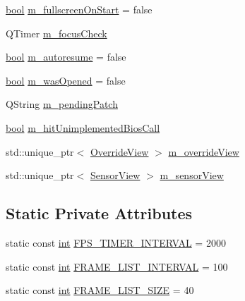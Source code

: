 \begin{DoxyCompactItemize}
\item 
\mbox{\hyperlink{libretro_8h_a4a26dcae73fb7e1528214a068aca317e}{bool}} \mbox{\hyperlink{class_q_g_b_a_1_1_window_ae96899be0952b7f0329ccf2142bc7400}{m\+\_\+fullscreen\+On\+Start}} = false
\item 
Q\+Timer \mbox{\hyperlink{class_q_g_b_a_1_1_window_af5c6c03bb6868222517bbc5c5bc8a091}{m\+\_\+focus\+Check}}
\item 
\mbox{\hyperlink{libretro_8h_a4a26dcae73fb7e1528214a068aca317e}{bool}} \mbox{\hyperlink{class_q_g_b_a_1_1_window_af5d25084346b2cb25387d0d351d9f79c}{m\+\_\+autoresume}} = false
\item 
\mbox{\hyperlink{libretro_8h_a4a26dcae73fb7e1528214a068aca317e}{bool}} \mbox{\hyperlink{class_q_g_b_a_1_1_window_a23c19613ffd9ef874abf68a83417004d}{m\+\_\+was\+Opened}} = false
\item 
Q\+String \mbox{\hyperlink{class_q_g_b_a_1_1_window_a9eab696d83d55f3636732fd1f72116fa}{m\+\_\+pending\+Patch}}
\item 
\mbox{\hyperlink{libretro_8h_a4a26dcae73fb7e1528214a068aca317e}{bool}} \mbox{\hyperlink{class_q_g_b_a_1_1_window_a30063666e74e9c2de810e80a2fdb87dc}{m\+\_\+hit\+Unimplemented\+Bios\+Call}}
\item 
std\+::unique\+\_\+ptr$<$ \mbox{\hyperlink{class_q_g_b_a_1_1_override_view}{Override\+View}} $>$ \mbox{\hyperlink{class_q_g_b_a_1_1_window_a3b058447bfa53782c268fdcc1b035184}{m\+\_\+override\+View}}
\item 
std\+::unique\+\_\+ptr$<$ \mbox{\hyperlink{class_q_g_b_a_1_1_sensor_view}{Sensor\+View}} $>$ \mbox{\hyperlink{class_q_g_b_a_1_1_window_ae3cb43b35d0a827094e2491ee09f2056}{m\+\_\+sensor\+View}}
\end{DoxyCompactItemize}
\subsection*{Static Private Attributes}
\begin{DoxyCompactItemize}
\item 
static const \mbox{\hyperlink{ioapi_8h_a787fa3cf048117ba7123753c1e74fcd6}{int}} \mbox{\hyperlink{class_q_g_b_a_1_1_window_a3429e7b95854ae5e646481d4a933ca04}{F\+P\+S\+\_\+\+T\+I\+M\+E\+R\+\_\+\+I\+N\+T\+E\+R\+V\+AL}} = 2000
\item 
static const \mbox{\hyperlink{ioapi_8h_a787fa3cf048117ba7123753c1e74fcd6}{int}} \mbox{\hyperlink{class_q_g_b_a_1_1_window_a66d2864437fc3737056e41e24fd659d7}{F\+R\+A\+M\+E\+\_\+\+L\+I\+S\+T\+\_\+\+I\+N\+T\+E\+R\+V\+AL}} = 100
\item 
static const \mbox{\hyperlink{ioapi_8h_a787fa3cf048117ba7123753c1e74fcd6}{int}} \mbox{\hyperlink{class_q_g_b_a_1_1_window_ad875541a4009c8c11ec7fc3225d24fa6}{F\+R\+A\+M\+E\+\_\+\+L\+I\+S\+T\+\_\+\+S\+I\+ZE}} = 40
\end{DoxyCompactItemize}


